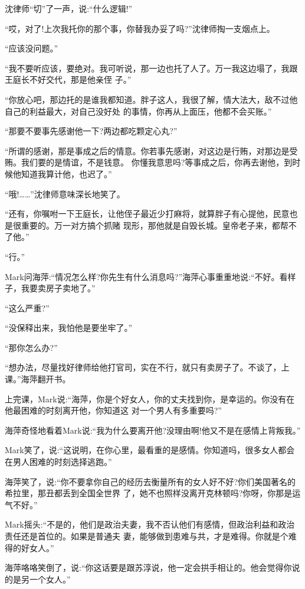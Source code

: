 \documentclass[11pt,a4paper,onecolumn]{article}
\begin{document}
沈律师``切''了一声，说:``什么逻辑!''

``哎，对了!上次我托你的那个事，你替我办妥了吗?''沈律师掏一支烟点上。

``应该没问题。''

``我不要听应该，要绝对。我可听说，那一边也托了人了。万一我这边塌了，我跟王庭长不好交代，那是他亲侄
子。''

``你放心吧，那边托的是谁我都知道。胖子这人，我很了解，情大法大，敌不过他自己的利益最大，对自己没好处
的事情，你再从上面压，他都不会买账。''

``那要不要事先感谢他一下?两边都吃颗定心丸?''

``所谓的感谢，那是事成之后的情意。你若事先感谢，对这边是行贿，对那边是受贿。我们要的是情谊，不是钱意。
你懂我意思吗?等事成之后，你再去谢他，到时候他知道我算计他，也迟了。''

``哦!……''沈律师意味深长地笑了。

``还有，你嘱咐一下王庭长，让他侄子最近少打麻将，就算胖子有心提他，民意也是很重要的。万一对方搞个抓赌
现形，那他就是自毁长城。皇帝老子来，都帮不了他。''

``行。''

Mark问海萍:``情况怎么样?你先生有什么消息吗?''海萍心事重重地说:``不好。看样子，我要卖房子卖地了。''

``这么严重?''

``没保释出来，我怕他是要坐牢了。''

``那你怎么办?''

``想办法，尽量找好律师给他打官司，实在不行，就只有卖房子了。不谈了，上课。''海萍翻开书。

上完课，Mark说:``海萍，你是个好女人，你的丈夫找到你，是幸运的。你没有在他最困难的时刻离开他，你知道这
对一个男人有多重要吗?''

海萍奇怪地看着Mark说:``我为什么要离开他?没理由啊!他又不是在感情上背叛我。''

Mark笑了，说:``这说明，在你心里，最看重的是感情。你知道吗，很多女人都会在男人困难的时刻选择逃跑。''

海萍笑了，说:``你不要拿你自己的经历去衡量所有的女人好不好?你们美国著名的希拉里，那丑都丢到全国全世界
了，她不也照样没离开克林顿吗?你呀，你那是运气不好。''

Mark摇头:``不是的，他们是政治夫妻，我不否认他们有感情，但政治利益和政治责任还是首位的。如果是普通夫
妻，能够做到患难与共，才是难得。你就是个难得的好女人。''

海萍咯咯笑倒了，说:``你这话要是跟苏淳说，他一定会拱手相让的。他会觉得你说的是另一个女人。''
\end{document}
